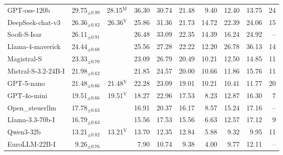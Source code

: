 \begin{tabular}{l @{\hspace{1em}} r r @{\hspace{0.5em}} r r r @{\hspace{0.5em}} r @{\hspace{1em}} r r @{\hspace{1em}} r}
GPT-oss-120b & 29.75$_{\pm0.99}$ & \cellcolor[HTML]{E58267}28.15$^{\mathrm{M}}$ & \cellcolor[HTML]{B0D4E7}36.30 & \cellcolor[HTML]{F7F7F7}30.74 & \cellcolor[HTML]{E48066}21.48 & 9.40 & 12.40 & 13.75 & 24 \\
DeepSeek-chat-v3 & 26.36$_{\pm0.82}$ & \cellcolor[HTML]{F7F7F7}26.36$^{\mathrm{V}}$ & \cellcolor[HTML]{F7F7F7}25.86 & \cellcolor[HTML]{B1D5E7}31.36 & \cellcolor[HTML]{FCD4BE}21.73 & 14.72 & 22.39 & 24.06 & 15 \\
Soofi-S-Isar & 26.11$_{\pm0.91}$ &  & \cellcolor[HTML]{F7F7F7}26.48 & \cellcolor[HTML]{9ECBE1}33.09 & \cellcolor[HTML]{FCD4BE}22.35 & 14.39 & 16.24 & 24.92 & -- \\
Llama-4-maverick & 24.44$_{\pm0.68}$ &  & \cellcolor[HTML]{F7F7F7}25.56 & \cellcolor[HTML]{E5EEF4}27.28 & \cellcolor[HTML]{FCDDCB}22.22 & 12.20 & 26.78 & 36.13 & 14 \\
Magistral-S & 23.33$_{\pm0.70}$ &  & \cellcolor[HTML]{F7F7F7}23.09 & \cellcolor[HTML]{D0E5F0}26.79 & \cellcolor[HTML]{FBE3D5}20.49 & 10.21 & 12.50 & 14.85 & 11 \\
Mistral-S-3.2-24B-I & 21.98$_{\pm0.62}$ &  & \cellcolor[HTML]{F7F7F7}21.85 & \cellcolor[HTML]{DBEAF2}24.57 & \cellcolor[HTML]{FAE9DF}20.00 & 10.66 & 11.86 & 15.76 & 11 \\
GPT-5-nano & 21.48$_{\pm0.66}$ & \cellcolor[HTML]{F7F7F7}21.48$^{\mathrm{V}}$ & \cellcolor[HTML]{F7F7F7}22.28 & \cellcolor[HTML]{EFF3F5}23.09 & \cellcolor[HTML]{FCDECC}19.01 & 10.21 & 10.41 & 11.77 & 20 \\
GPT-4o-mini & 19.51$_{\pm0.66}$ & \cellcolor[HTML]{F7F7F7}19.51$^{\mathrm{V}}$ & \cellcolor[HTML]{F7F7F7}18.27 & \cellcolor[HTML]{BFDCEB}22.96 & \cellcolor[HTML]{F8F1ED}17.53 & 8.23 & 12.87 & 16.30 & 7 \\
Open\_steuerllm & 17.78$_{\pm0.63}$ &  & \cellcolor[HTML]{F7F7F7}16.91 & \cellcolor[HTML]{D3E6F0}20.37 & \cellcolor[HTML]{F8F1ED}16.17 & 8.57 & 15.24 & 17.16 & -- \\
Llama-3.3-70b-I & 16.79$_{\pm0.63}$ &  & \cellcolor[HTML]{F7F7F7}15.56 & \cellcolor[HTML]{E2EDF3}17.53 & \cellcolor[HTML]{F7F7F7}15.56 & 6.63 & 12.57 & 17.12 & 9 \\
Qwen3-32b & 13.21$_{\pm0.82}$ & \cellcolor[HTML]{F7F7F7}13.21$^{\mathrm{V}}$ & \cellcolor[HTML]{EEF3F5}13.70 & \cellcolor[HTML]{F8F3F1}12.35 & \cellcolor[HTML]{F7F7F7}12.84 & 5.88 & 9.32 & 9.95 & 11 \\
EuroLLM-22B-I & 9.26$_{\pm0.76}$ &  & \cellcolor[HTML]{F9ECE4}7.90 & \cellcolor[HTML]{E9F0F4}10.74 & \cellcolor[HTML]{F7F7F7}9.38 & 4.00 & 9.77 & 12.11 & -- \\

\end{tabular}

